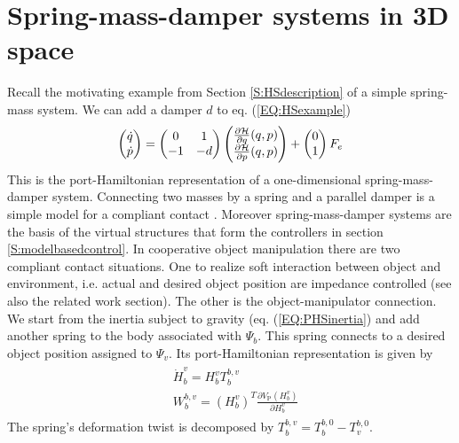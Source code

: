 \documentclass[a4paper,twoside, openright,12pt]{report}
\newcommand{\g}[1]{\text{#1}}
\begin{document}
{\section{Spring-mass-damper systems in 3D space}\label{S:springmassdampers}
Recall the motivating example from Section \ref{S:HSdescription} of a simple spring-mass system. We can add a damper $d$ to eq. (\ref{EQ:HSexample})
\begin{equation}
	\begin{pmatrix}\dot{q} \\ \dot{p}\end{pmatrix} =
	\begin{pmatrix}0 & 1 \\ -1 & -d\end{pmatrix}
	\begin{pmatrix}\frac{\partial \mathcal{H}}{\partial q}(q,p) \\ \frac{\partial \mathcal{H}}{\partial p}(q,p)\end{pmatrix} + 
	\begin{pmatrix}0 \\ 1\end{pmatrix} F_e\\  
\end{equation}
This is the port-Hamiltonian representation of a one-dimensional spring-mass-damper system. Connecting two masses by a spring and a parallel damper is a simple model for a compliant contact \cite{Duindam_09}. Moreover spring-mass-damper systems are the basis of the virtual structures that form the controllers in section \ref{S:modelbasedcontrol}. In cooperative object manipulation there are two compliant contact situations. One to realize soft interaction between object and environment, i.e. actual and desired object position are impedance controlled (see also the related work section). The other is the object-manipulator connection. We start from the inertia subject to gravity (eq. (\ref{EQ:PHSinertia}) and add another spring to the body associated with $\Psi_b$. This spring connects to a desired object position assigned to $\Psi_v$. Its port-Hamiltonian representation is given by
\begin{eqnarray}
\begin{aligned}
	&\dot{H}_b^v = H_b^v T_b^{b,v}\\
	&W_b^{b,v} = (H_b^v)^T\frac{\partial V_\g{P}(H_b^v)}{\partial H_b^v}
\end{aligned}
\end{eqnarray}
The spring's deformation twist is decomposed by $T_b^{b,v} = T_b^{b,0} - T_v^{b,0}$.
}
\end{document}

